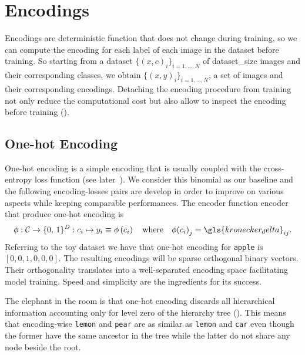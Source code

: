 \section{Encodings}
\label{sec:encodings}

Encodings are deterministic function that does not change during training, so we can compute the encoding for each label of each image in the dataset before training. So starting from a dataset $\{ \left(x, c\right)_i \}_{i = 1, \ldots, N}$ of \gls{dataset_size} images and their corresponding classes, we obtain $\{ \left(x, y\right)_i \}_{i = 1, \ldots, N}$, a set of images and their corresponding encodings.
Detaching the encoding procedure from training not only reduce the computational cost but also allow to inspect the encoding before training ().

\subsection{One-hot Encoding}
\label{subsec:one-hot-encoding}

One-hot encoding is a simple encoding that is usually coupled with the cross-entropy loss function (see later~). We consider this binomial as our baseline and the following encoding-losses pairs are develop in order to improve on various aspects while keeping comparable performances.
The encoder function \gls{encoder} that produce one-hot encoding is
\begin{equation}
  \phi: \mathcal{C} \to \{0, \,1\}^{D}
      : c_i \mapsto y_i \equiv \phi \left(c_i\right)
  \quad \text{where} \quad
  \phi{\left(c_i\right)}_j = \gls{kronecker_delta}_{ij}.
  \label{eq:one-hot-encoding}
\end{equation}
Referring to the toy dataset we have that one-hot encoding for \texttt{apple} is $\left[0, 0, 1, 0, 0, 0\right]$. The resulting encodings will be sparse orthogonal binary vectors. Their orthogonality translates into a well-separated encoding space facilitating model training. Speed and simplicity are the ingredients for its success.

The elephant in the room is that one-hot encoding discards all hierarchical information accounting only for level zero of the hierarchy tree (). This means that encoding-wise \texttt{lemon} and \texttt{pear} are as similar as \texttt{lemon} and \texttt{car} even though the former have the same ancestor in the tree while the latter do not share any node beside the root.

